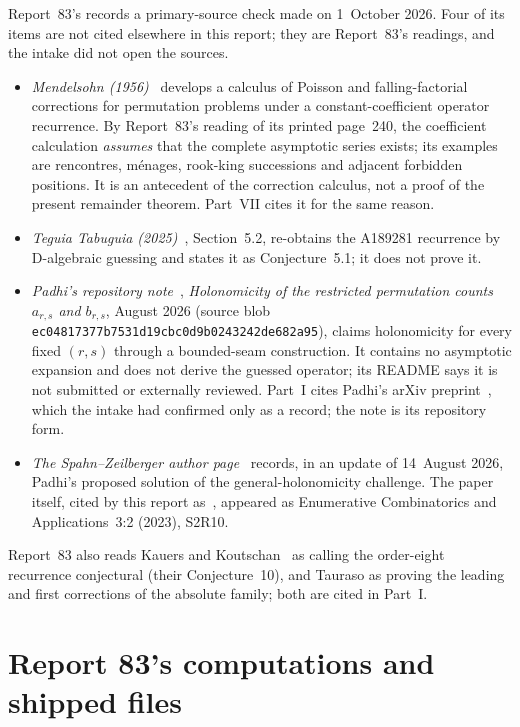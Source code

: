 \documentclass[11pt]{article}
\numberwithin{equation}{section}
\theoremstyle{definition}
\theoremstyle{remark}
\theoremstyle{definition}
\begin{document}
Report~83's  records a primary-source
check made on 1~October 2026. Four of its items are not cited elsewhere in
this report; they are Report~83's readings, and the intake did not open the
sources.
\begin{itemize}
\item \emph{Mendelsohn (1956)}~\cite{fdMendelsohn} develops a calculus of
 Poisson and falling-factorial corrections for permutation problems under
 a constant-coefficient operator recurrence. By Report~83's reading of its
 printed page~240, the coefficient calculation \emph{assumes} that the
 complete asymptotic series exists; its examples are rencontres, m\'enages,
 rook-king successions and adjacent forbidden positions. It is an
 antecedent of the correction calculus, not a proof of the present
 remainder theorem. Part~VII cites it for the same reason.
\item \emph{Teguia Tabuguia (2025)}~\cite{fdTabuguia}, Section~5.2,
 re-obtains the A189281 recurrence by D-algebraic guessing and states it as
 Conjecture~5.1; it does not prove it.
\item \emph{Padhi's repository note}~\cite{fdPadhiNote}, \emph{Holonomicity
 of the restricted permutation counts $a_{r,s}$ and $b_{r,s}$}, August 2026
 (source blob \texttt{ec04817377b7531d19cbc0d9b0243242de682a95}), claims
 holonomicity for every fixed $(r,s)$ through a bounded-seam construction.
 It contains no asymptotic expansion and does not derive the guessed
 operator; its README says it is not submitted or externally reviewed.
 Part~I cites Padhi's arXiv preprint~\cite{padhi}, which the intake had
 confirmed only as a record; the note is its repository form.
\item \emph{The Spahn--Zeilberger author page}~\cite{fdSZpage} records, in
 an update of 14~August 2026, Padhi's proposed solution of the
 general-holonomicity challenge. The paper itself, cited by this report
 as~\cite{spahn}, appeared as Enumerative Combinatorics and
 Applications~3:2 (2023), S2R10.
\end{itemize}
Report~83 also reads Kauers and Koutschan~\cite{kauers} as calling the
order-eight recurrence conjectural (their Conjecture~10), and Tauraso as
proving the leading and first corrections of the absolute family; both are
cited in Part~I.

\section{Report 83's computations and shipped files}
\label{spf:fd:sec:files}
\end{document}
